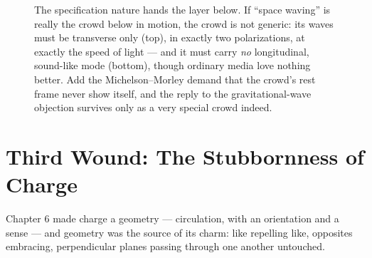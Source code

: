 \documentclass[fontsize=11pt,paper=a4,pagesize=auto,parskip=half-]{scrbook}
\begin{document}
\begin{figure}[htbp]
\centering
{}
\caption{The specification nature hands the layer below. If ``space waving'' is really the crowd below in motion, the crowd is not generic: its waves must be transverse only (top), in exactly two polarizations, at exactly the speed of light --- and it must carry \emph{no} longitudinal, sound-like mode (bottom), though ordinary media love nothing better. Add the Michelson--Morley demand that the crowd's rest frame never show itself, and the reply to the gravitational-wave objection survives only as a very special crowd indeed.}
\label{fig:wavemodes}
\end{figure}

\section{Third Wound: The Stubbornness of Charge}

Chapter 6 made charge a geometry --- circulation, with an orientation and a sense --- and geometry was the source of its charm: like repelling like, opposites embracing, perpendicular planes passing through one another untouched.
\end{document}

